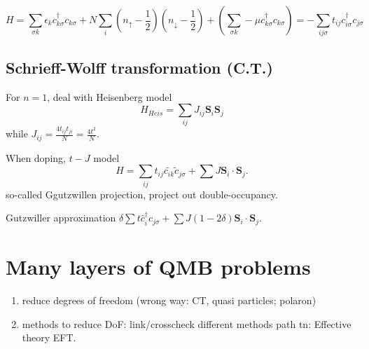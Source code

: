 \begin{equation}
  H = \sum_{\sigma k} \epsilon_k c_{k\sigma}^\dagger c_{k\sigma} + N \sum_i (n_\uparrow -\frac12)(n_\downarrow -\frac12) + (\sum_{\sigma k} -\mu c_{k\sigma}^\dagger c_{k\sigma})
= -\sum_{ij\sigma} t_{ij} c_{i\sigma}^\dagger c_{j\sigma}
\end{equation}

\subsection{Schrieff-Wolff transformation (C.T.)}

For $n = 1$, deal with Heisenberg model
\begin{equation}
  H_{Heis} = \sum_{ij} J_{ij} \bm S_i \bm S_j
\end{equation}
while $J_{ij} = \frac{4t_{ij} t_{ji}}N = \frac{4t^2}{N}$.

When doping, $t-J$ model
\[
  H = \sum_{ij} t_{ij} \tilde{c_{ik}} \tilde c_{j\sigma} + \sum J \bm S_{i} \cdot \bm S_j.
\]
so-called Ggutzwillen projection, project out double-occupancy.

Gutzwiller approximation $\delta \sum t \hat c_i^\dagger c_{j\sigma} + \sum J(1 - 2\delta) \bm S_i \cdot \bm S_j$.

\section{Many layers of QMB problems}

\begin{enumerate}
  \item reduce degrees of freedom
    (wrong way: CT, quasi particles; polaron)
  \item methods to reduce DoF: link/crosscheck different methods
  path tn: Effective theory EFT.
\end{enumerate}
